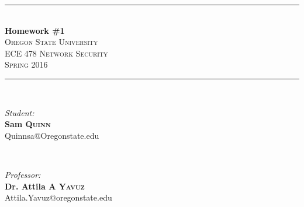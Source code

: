 \documentclass[letterpaper,11pt,notitlepage,fleqn]{article}
\begin{document}
\begin{titlepage}
    \vspace*{\fill}

    \newcommand{\HRule}{\rule{\linewidth}{0.5mm}} %

    \center %


    \HRule \\[0.4cm]
    { \huge \bfseries Homework \#1}\\[0.4cm] %


    \textsc{\LARGE Oregon State University}\\[0.5cm] %
    \textsc{\Large ECE 478 Network Security}\\[0.5cm] %
    \textsc{\large Spring 2016}\\[0.5cm] %


    \HRule \\[1.5cm]

    \begin{minipage}{0.4\textwidth}
        \begin{flushleft} \large
            \emph{Student:}\\
            \noindent \textbf{Sam \textsc{Quinn}} \\ %
            {\small Quinnsa@Oregonstate.edu}
        \end{flushleft}
    \end{minipage}
        ~
        \begin{minipage}{0.4\textwidth}
            \begin{flushright} \large
                \emph{Professor:} \\
                \noindent \textbf{Dr. Attila A \textsc{Yavuz}} \\ %
                {\small Attila.Yavuz@oregonstate.edu}
            \end{flushright}
        \end{minipage}\\[3cm]


\end{titlepage}
\end{document}
